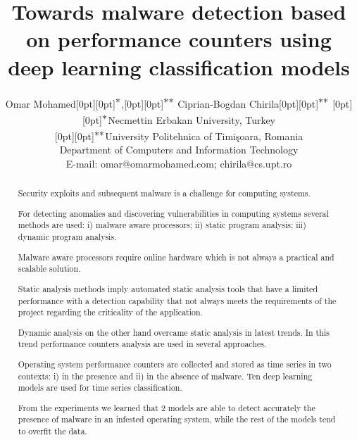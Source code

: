 \documentclass[conference]{IEEEtran}
\begin{document}
\title{Towards malware detection based on performance counters using deep learning classification models}

\DeclareRobustCommand*{\IEEEauthorrefmark}[1]{\raisebox{0pt}[0pt][0pt]{\textsuperscript{\footnotesize\ensuremath{
 \ifcase#1\or {*}\or {**}\or {{**}*}\or {{**}{**}}\or 5\or 6\or 7\or 8 \else\textsuperscript{\expandafter\romannumeral#1}\fi}}}}

\author
{
 \IEEEauthorblockN
 {
   Omar Mohamed\IEEEauthorrefmark{1},\IEEEauthorrefmark{2}
 }
 \IEEEauthorblockN
 {
  Ciprian-Bogdan Chirila\IEEEauthorrefmark{2}
 }
 \IEEEauthorblockA
 {\IEEEauthorrefmark{1}Necmettin Erbakan University, Turkey\\
  \IEEEauthorrefmark{2}University Politehnica of Timi\c{s}oara, Romania\\
  Department of Computers and Information Technology\\
  E-mail:
  omar@omarmohamed.com;
  chirila@cs.upt.ro
 }
}

\maketitle

\begin{abstract}
Security exploits and subsequent malware is a challenge for computing systems.

For detecting anomalies and discovering vulnerabilities in computing systems several methods are used: i) malware aware processors; ii) static program analysis; iii) dynamic program analysis.

Malware aware processors require online hardware which is not always a practical and scalable solution.

Static analysis methods imply automated static analysis tools that have a limited performance with
a detection capability that not always meets the requirements of the project regarding the criticality of the application.

Dynamic analysis on the other hand overcame static analysis in latest trends. In this trend performance counters analysis are used in several approaches. 

Operating system performance counters are collected and stored as time series in two contexts: i) in the presence and ii) in the absence of malware.
Ten deep learning models are used for time series classification. 

From the experiments we learned that 2 models are able to detect accurately the presence of malware in an infested operating system, while the rest of the models tend to overfit the data.
\end{abstract}
\end{document}
